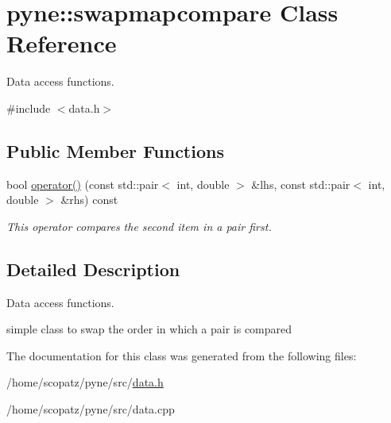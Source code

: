 \hypertarget{classpyne_1_1swapmapcompare}{\section{pyne\-:\-:swapmapcompare Class Reference}
\label{classpyne_1_1swapmapcompare}
}


Data access functions.  




{\ttfamily \#include $<$data.\-h$>$}

\subsection*{Public Member Functions}
\begin{DoxyCompactItemize}
\item 
\hypertarget{classpyne_1_1swapmapcompare_a766adfc375aa681d00aa60ac66a1fdd9}{bool \hyperlink{classpyne_1_1swapmapcompare_a766adfc375aa681d00aa60ac66a1fdd9}{operator()} (const std\-::pair$<$ int, double $>$ \&lhs, const std\-::pair$<$ int, double $>$ \&rhs) const }\label{classpyne_1_1swapmapcompare_a766adfc375aa681d00aa60ac66a1fdd9}

\begin{DoxyCompactList}\small\item\em This operator compares the second item in a pair first. \end{DoxyCompactList}\end{DoxyCompactItemize}


\subsection{Detailed Description}
Data access functions. 

simple class to swap the order in which a pair is compared 

The documentation for this class was generated from the following files\-:\begin{DoxyCompactItemize}
\item 
/home/scopatz/pyne/src/\hyperlink{data_8h}{data.\-h}\item 
/home/scopatz/pyne/src/data.\-cpp\end{DoxyCompactItemize}
